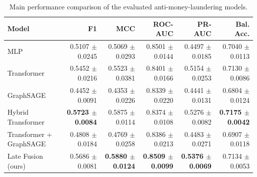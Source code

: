 \begin{table}[t]
\centering
\small
\caption{Main performance comparison of the evaluated anti-money-laundering models.}
\label{tab:main-results}
\begin{tabular}{lrrrrr}
\toprule
Model & F1 & MCC & ROC-AUC & PR-AUC & Bal. Acc. \\
\midrule
MLP & 0.5107 $\pm$ 0.0245 & 0.5069 $\pm$ 0.0293 & 0.8501 $\pm$ 0.0144 & 0.4497 $\pm$ 0.0185 & 0.7040 $\pm$ 0.0113 \\
Transformer & 0.5452 $\pm$ 0.0216 & 0.5523 $\pm$ 0.0381 & 0.8401 $\pm$ 0.0166 & 0.5154 $\pm$ 0.0253 & 0.7130 $\pm$ 0.0086 \\
GraphSAGE & 0.4452 $\pm$ 0.0091 & 0.4353 $\pm$ 0.0226 & 0.8339 $\pm$ 0.0220 & 0.4441 $\pm$ 0.0131 & 0.6804 $\pm$ 0.0124 \\
Hybrid Transformer & \textbf{0.5723 $\pm$ 0.0084} & 0.5875 $\pm$ 0.0114 & 0.8374 $\pm$ 0.0108 & 0.5276 $\pm$ 0.0082 & \textbf{0.7175 $\pm$ 0.0042} \\
Transformer + GraphSAGE & 0.4808 $\pm$ 0.0184 & 0.4769 $\pm$ 0.0258 & 0.8386 $\pm$ 0.0213 & 0.4483 $\pm$ 0.0271 & 0.6907 $\pm$ 0.0118 \\
Late Fusion (ours) & 0.5686 $\pm$ 0.0081 & \textbf{0.5880 $\pm$ 0.0124} & \textbf{0.8509 $\pm$ 0.0099} & \textbf{0.5376 $\pm$ 0.0069} & 0.7134 $\pm$ 0.0053 \\
\bottomrule
\end{tabular}
\end{table}
